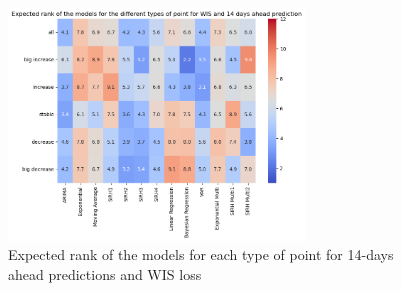 \begin{figure}[H]
    \centering
    \includegraphics[width=0.7\textwidth]{figures/heatmap_WIS_14.png}
    \caption{Expected rank of the models for each type of point for 14-days ahead predictions and WIS loss}
    \label{fig:heatmap_WIS_14}
\end{figure}



